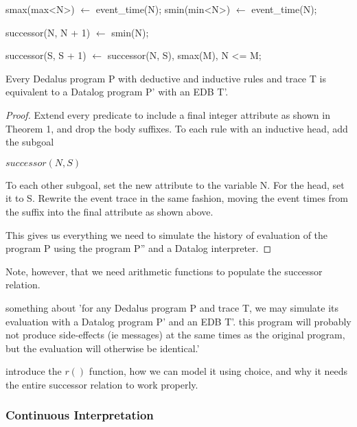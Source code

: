 \begin{Dedalus}
smax(max<N>) \(\leftarrow\) event\_time(N);
smin(min<N>) \(\leftarrow\) event\_time(N);

successor(N, N + 1) \(\leftarrow\) smin(N);

successor(S, S + 1) \(\leftarrow\) 
    successor(N, S),
    smax(M),
    N <= M;
\end{Dedalus}


\begin{theorem}
Every Dedalus program P with deductive and inductive rules and trace T is equivalent to a Datalog program P' with an EDB T'.
\end{theorem}

\begin{proof}

Extend every predicate to include a final integer attribute as shown in Theorem 1, and drop the body suffixes.  To each rule with an 
inductive head, add the subgoal 

$successor(N, S)$

To each other subgoal, set the new attribute to the variable N.  For the head, set it to S.  Rewrite the event trace in the same fashion, 
moving the event times from the suffix into the final attribute as shown above.


This gives us everything we need to simulate the history of evaluation of the program P using the program P'' and a Datalog interpreter.

\end{proof}

Note, however, that we need arithmetic functions to populate the successor relation.

\begin{theorem}
something about 'for any Dedalus program P and trace T, we may simulate its evaluation with a Datalog program P' and an EDB T'.  this program
will probably not produce side-effects (ie messages) at the same times as the original program, but the evaluation will otherwise be identical.'
\end{theorem}

introduce the $r()$ function, how we can model it using choice, and why it needs the entire successor relation to work properly.



\subsubsection{Continuous Interpretation}

